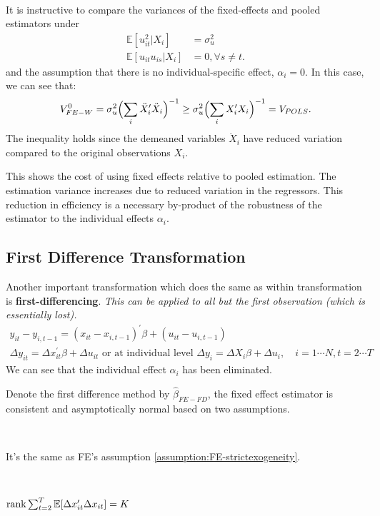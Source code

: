 \begin{remark}[FE VS. POLS]
    \

    It is instructive to compare the variances of the fixed-effects and pooled estimators under
    \begin{align*}
        \mathbb{E}[u_{it}^2 | X_i] &= \sigma_u^2 \\
        \mathbb{E}[u_{it} u_{is} | X_i] &= 0, \forall s \neq t.
    \end{align*}
    and the assumption that there is no individual-specific effect, $\alpha_i = 0$.
    In this case, we can see that:
    \begin{gather*}
        V_{FE-W}^0 = \sigma_u^2 \Bigl( \sum_{i} \ddot{X}_i^{\prime} \ddot{X}_i \Bigr)^{-1} \geq \sigma_u^2 \Bigl( \sum_{i} X_i^{\prime} X_i \Bigr)^{-1} = V_{POLS}.
    \end{gather*}
    The inequality holds since the demeaned variables $\ddot{X}_i$ have reduced variation compared to the original observations $X_i$.

    This shows the cost of using fixed effects relative to pooled estimation. 
    The estimation variance increases due to reduced variation in the regressors. 
    This reduction in efficiency is a necessary by-product of the robustness of the estimator to the individual effects $\alpha_i$.
\end{remark}

\subsection{First Difference Transformation}

Another important transformation which does the same as within transformation is \textbf{first-differencing}.
\emph{This can be applied to all but the first
observation (which is essentially lost).}
\begin{gather*}
    y_{it} - y_{i, t-1} = (x_{it} - x_{i, t-1})^{\prime} \beta + (u_{it} - u_{i, t-1}) \\
    \Delta y_{it} = \Delta x_{it}^{\prime} \beta + \Delta u_{it} \text{ or at individual level } \Delta y_i = \Delta X_i \beta + \Delta u_i, \quad i=1 \cdots N, t=2 \cdots T
\end{gather*}
We can see that the individual effect $\alpha_i$ has been eliminated.

Denote the first difference method by $\hat{\beta}_{FE-FD}$, 
the fixed effect estimator is consistent and asymptotically normal based on two assumptions.
\begin{assumption}\label{assumption:FD1}
    \

    It's the same as FE's assumption \ref{assumption:FE-strictexogeneity}.
\end{assumption}
\begin{assumption}\label{assumption:FD2}
    \

    $\operatorname{rank} \sum_{t=2}^{T} \mathbb{E}[\Delta x_{it}^{\prime} \Delta x_{it}] = K$
\end{assumption}

